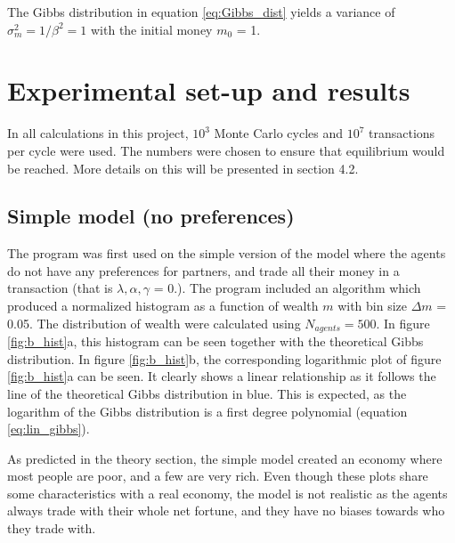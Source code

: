 \documentclass[11pt,a4paper,titlepage]{article}
\begin{document}
The Gibbs distribution in equation \ref{eq:Gibbs_dist} yields a variance of $\sigma^2_m = 1/\beta^2=1$ with the initial money $m_0$ = 1. 
\section{Experimental set-up and results}
In all calculations in this project, $\textrm{$10^3$}$ Monte Carlo cycles and $\textrm{$10^7$}$ transactions per cycle were used. The numbers were chosen to ensure that equilibrium would be reached. More details on this will be presented in section 4.2.
\subsection{Simple model (no preferences)}
The program was first used on the simple version of the model where the agents do not have any preferences for partners, and trade all their money in a transaction (that is $\lambda, \alpha, \gamma$ = 0.). The program included an algorithm which produced a normalized histogram as a function of wealth $m$ with bin size $\Delta m$ = 0.05. The distribution of wealth were calculated using $N_{agents} = 500$. In figure \ref{fig:b_hist}a, this histogram can be seen together with the theoretical Gibbs distribution. In figure \ref{fig:b_hist}b, the corresponding logarithmic plot of figure \ref{fig:b_hist}a can be seen. It clearly shows a linear relationship as it follows the line of the theoretical Gibbs distribution in blue. This is expected, as the logarithm of the Gibbs distribution is a first degree polynomial (equation \ref{eq:lin_gibbs}). 

As predicted in the theory section, the simple model created an economy where most people are poor, and a few are very rich. Even though these plots share some characteristics with a real economy, the model is not realistic as the agents always trade with their whole net fortune, and they have no biases towards who they trade with. 
\end{document}
